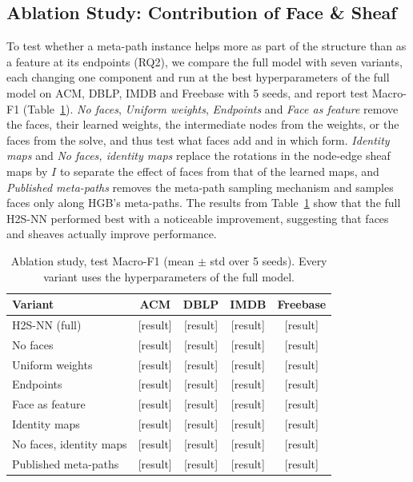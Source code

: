 \documentclass{article}
\newcommand{\method}{\textsc{H2S-NN}}
\newcommand{\res}{{\scriptsize[result]}}
\begin{document}
\subsection{Ablation Study: Contribution of Face \& Sheaf}
To test whether a meta-path instance helps more as part of the structure than as a feature at its endpoints (RQ2), we compare the full model with seven variants, each changing one component and run at the best hyperparameters of the full model on ACM, DBLP, IMDB and Freebase with 5 seeds, and report test Macro-F1 (Table~\ref{tab:ablation}). \emph{No faces}, \emph{Uniform weights}, \emph{Endpoints} and \emph{Face as feature} remove the faces, their learned weights, the intermediate nodes from the weights, or the faces from the solve, and thus test what faces add and in which form. \emph{Identity maps} and \emph{No faces, identity maps} replace the rotations in the node-edge sheaf maps by $I$ to separate the effect of faces from that of the learned maps, and \emph{Published meta-paths} removes the meta-path sampling mechanism and samples faces only along HGB's meta-paths. The results from Table~\ref{tab:ablation} show that the full \method{} performed best with a noticeable improvement, suggesting that faces and sheaves actually improve performance.


\begin{table}[!htbp]
  \centering
  \caption{Ablation study, test Macro-F1 (mean $\pm$ std over 5 seeds). Every variant uses the hyperparameters of the full model.}
  \label{tab:ablation}
  \scriptsize
  \setlength{\tabcolsep}{3pt}
  \begin{tabular}{lcccc}
    \toprule
    \textbf{Variant} & ACM & DBLP & IMDB & Freebase \\
    \midrule
    \method{} (full) & \res & \res & \res & \res \\
    \midrule
    No faces & \res & \res & \res & \res \\
    Uniform weights & \res & \res & \res & \res \\
    Endpoints & \res & \res & \res & \res \\
    Face as feature & \res & \res & \res & \res \\
    \midrule
    Identity maps & \res & \res & \res & \res \\
    No faces, identity maps & \res & \res & \res & \res \\
    \midrule
    Published meta-paths & \res & \res & \res & \res \\
    \bottomrule
  \end{tabular}
\end{table}
\end{document}
